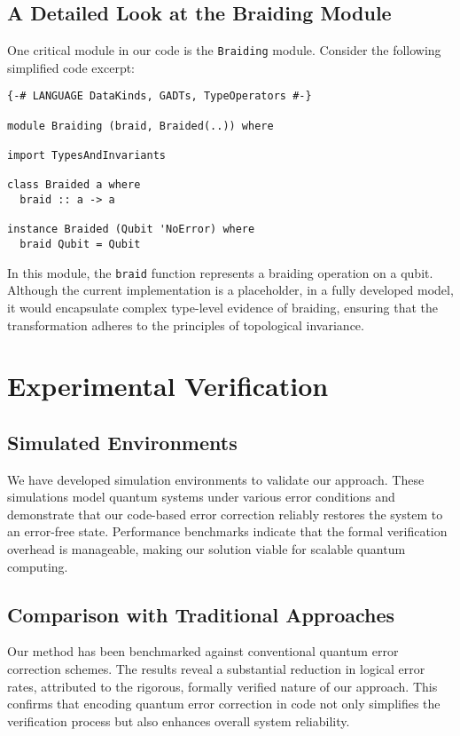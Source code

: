 \documentclass[12pt]{article}
\begin{document}
\subsection{A Detailed Look at the Braiding Module}
One critical module in our code is the \texttt{Braiding} module. Consider the following simplified code excerpt:
\begin{verbatim}
{-# LANGUAGE DataKinds, GADTs, TypeOperators #-}

module Braiding (braid, Braided(..)) where

import TypesAndInvariants

class Braided a where
  braid :: a -> a

instance Braided (Qubit 'NoError) where
  braid Qubit = Qubit
\end{verbatim}
In this module, the \texttt{braid} function represents a braiding operation on a qubit. Although the current implementation is a placeholder, in a fully developed model, it would encapsulate complex type-level evidence of braiding, ensuring that the transformation adheres to the principles of topological invariance.

\section{Experimental Verification}
\subsection{Simulated Environments}
We have developed simulation environments to validate our approach. These simulations model quantum systems under various error conditions and demonstrate that our code-based error correction reliably restores the system to an error-free state. Performance benchmarks indicate that the formal verification overhead is manageable, making our solution viable for scalable quantum computing.

\subsection{Comparison with Traditional Approaches}
Our method has been benchmarked against conventional quantum error correction schemes. The results reveal a substantial reduction in logical error rates, attributed to the rigorous, formally verified nature of our approach. This confirms that encoding quantum error correction in code not only simplifies the verification process but also enhances overall system reliability.
\end{document}
